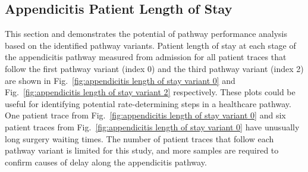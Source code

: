 \documentclass{elsarticle}
\begin{document}
\subsection{Appendicitis Patient Length of Stay}
This section and demonstrates the potential of pathway performance analysis based on the identified pathway variants. Patient length of stay at each stage of the appendicitis pathway measured from admission for all patient traces that follow the first pathway variant (index 0) and the third pathway variant (index 2) are shown in Fig.~\ref{fig:appendicitis length of stay variant 0} and Fig.~\ref{fig:appendicitis length of stay variant 2} respectively. These plots could be useful for identifying potential rate-determining steps in a healthcare pathway. One patient trace from Fig.~\ref{fig:appendicitis length of stay variant 0} and six patient traces from Fig.~\ref{fig:appendicitis length of stay variant 0} have unusually long surgery waiting times. The number of patient traces that follow each pathway variant is limited for this study, and more samples are required to confirm causes of delay along the appendicitis pathway. 
\end{document}
